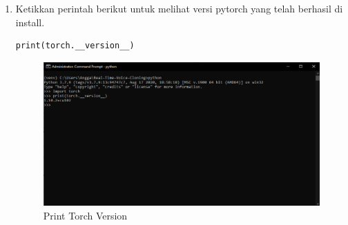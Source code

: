 \begin{enumerate}
\item Ketikkan perintah berikut untuk melihat versi pytorch yang telah berhasil di install.
\begin{verbatim}
print(torch.__version__)
\end{verbatim}
\begin{figure}[H]
\centering
\includegraphics[scale=.35]{figures/pytorch7}
\caption{Print Torch Version}
\label{pytorch7}
\end{figure}

\end{enumerate}


